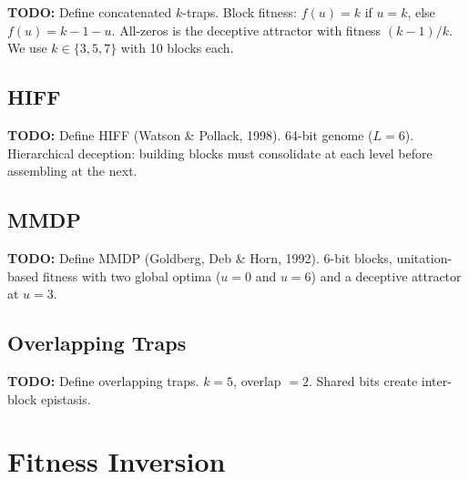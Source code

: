 \documentclass[sigconf,nonacm]{acmart}
\begin{document}

\textbf{TODO:} Define concatenated $k$-traps. Block fitness:
$f(u) = k$ if $u = k$, else $f(u) = k - 1 - u$. All-zeros is the
deceptive attractor with fitness $(k-1)/k$. We use $k \in \{3, 5, 7\}$
with 10 blocks each.

\subsection{HIFF}


\textbf{TODO:} Define HIFF (Watson \& Pollack, 1998). 64-bit genome
($L = 6$). Hierarchical deception: building blocks must consolidate
at each level before assembling at the next.

\subsection{MMDP}


\textbf{TODO:} Define MMDP (Goldberg, Deb \& Horn, 1992). 6-bit blocks,
unitation-based fitness with two global optima ($u = 0$ and $u = 6$)
and a deceptive attractor at $u = 3$.

\subsection{Overlapping Traps}


\textbf{TODO:} Define overlapping traps. $k = 5$, overlap $= 2$.
Shared bits create inter-block epistasis.


\section{Fitness Inversion}
\label{sec:inversion}

\end{document}
